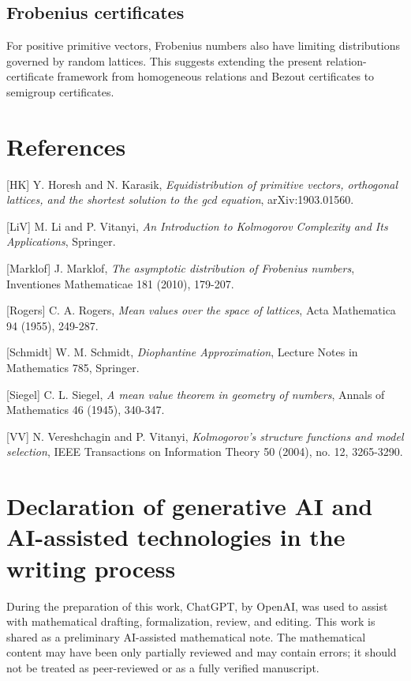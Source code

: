 \documentclass[11pt]{article}
\begin{document}
\subsection{Frobenius certificates}

For positive primitive vectors, Frobenius numbers also have limiting distributions governed by random lattices. This suggests extending the present relation-certificate framework from homogeneous relations and Bezout certificates to semigroup certificates.

\section*{References}
\small
\sloppy

[HK] Y. Horesh and N. Karasik, \emph{Equidistribution of primitive vectors, orthogonal lattices, and the shortest solution to the gcd equation}, arXiv:1903.01560.

[LiV] M. Li and P. Vitanyi, \emph{An Introduction to Kolmogorov Complexity and Its Applications}, Springer.

[Marklof] J. Marklof, \emph{The asymptotic distribution of Frobenius numbers}, Inventiones Mathematicae 181 (2010), 179-207.

[Rogers] C. A. Rogers, \emph{Mean values over the space of lattices}, Acta Mathematica 94 (1955), 249-287.

[Schmidt] W. M. Schmidt, \emph{Diophantine Approximation}, Lecture Notes in Mathematics 785, Springer.

[Siegel] C. L. Siegel, \emph{A mean value theorem in geometry of numbers}, Annals of Mathematics 46 (1945), 340-347.

[VV] N. Vereshchagin and P. Vitanyi, \emph{Kolmogorov's structure functions and model selection}, IEEE Transactions on Information Theory 50 (2004), no. 12, 3265-3290.

\section*{Declaration of generative AI and AI-assisted technologies in the writing process}
During the preparation of this work, ChatGPT, by OpenAI, was used to assist with mathematical drafting, formalization, review, and editing. This work is shared as a preliminary AI-assisted mathematical note. The mathematical content may have been only partially reviewed and may contain errors; it should not be treated as peer-reviewed or as a fully verified manuscript.
\end{document}
